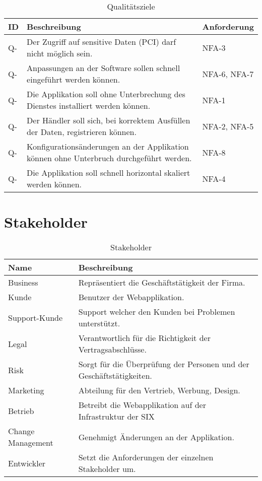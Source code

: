 \begin{table}[H]
	\centering
	\caption{Qualitätsziele}
	\begin{tabular}{ | p{1cm} | p{11cm} | p{3cm} | }
		\toprule
		{\textbf{ID}} & {\textbf{Beschreibung}} & {\textbf{Anforderung}}\\
		\midrule
		Q-\arabic{quatar} \stepcounter{quatar} & Der Zugriff auf sensitive Daten (PCI) darf nicht möglich sein. & NFA-3\\ \hline
		Q-\arabic{quatar} \stepcounter{quatar} & Anpassungen an der Software sollen schnell eingeführt werden können. & NFA-6, NFA-7\\ \hline
		Q-\arabic{quatar} \stepcounter{quatar} & Die Applikation soll ohne Unterbrechung des Dienstes installiert werden können. & NFA-1\\ \hline
		Q-\arabic{quatar} \stepcounter{quatar} & Der Händler soll sich, bei korrektem Ausfüllen der Daten, registrieren können. & NFA-2, NFA-5 \\ \hline
		Q-\arabic{quatar} \stepcounter{quatar} & Konfigurationsänderungen an der Applikation können ohne Unterbruch durchgeführt werden. & NFA-8 \\ \hline
		Q-\arabic{quatar} \stepcounter{quatar} & Die Applikation soll schnell horizontal skaliert werden können. & NFA-4 \\
		\bottomrule
	\end{tabular}
\end{table}

\section{Stakeholder}

\begin{table}[H]
	\centering
	\caption{Stakeholder}
	\begin{tabular}{ | p{3cm} | p{12cm} | }
		\toprule
		{\textbf{Name}} & {\textbf{Beschreibung}} \\
		\midrule
		Business & Repräsentiert die Geschäftstätigkeit der Firma.\\ \hline
		Kunde & Benutzer der Webapplikation. \\ \hline
		Support-Kunde & Support welcher den Kunden bei Problemen unterstützt. \\ \hline
		Legal &  Verantwortlich für die Richtigkeit der Vertragsabschlüsse. \\ \hline
		Risk & Sorgt für die Überprüfung der Personen und der Geschäftstätigkeiten. \\ \hline
		Marketing & Abteilung für den Vertrieb, Werbung, Design. \\ \hline
		Betrieb & Betreibt die Webapplikation auf der Infrastruktur der SIX \\ \hline
		Change Management & Genehmigt Änderungen an der Applikation. \\ \hline
		Entwickler & Setzt die Anforderungen der einzelnen Stakeholder um. \\
		\bottomrule
	\end{tabular}
\end{table}
